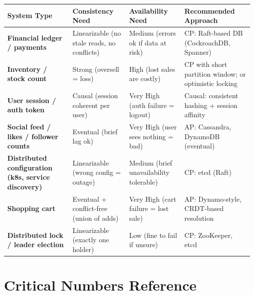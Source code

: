 \documentclass[11pt,a4paper]{article}
\begin{document}
\begin{center}
\begin{tabular}{>{\bfseries}p{3.2cm} p{3.5cm} p{3.5cm} p{3.8cm}}
\toprule
\textbf{System Type} & \textbf{Consistency Need} & \textbf{Availability Need} & \textbf{Recommended Approach} \\
\midrule
Financial ledger / payments & Linearizable (no stale reads, no conflicts) & Medium (errors ok if data at risk) & CP: Raft-based DB (CockroachDB, Spanner) \\
\addlinespace
Inventory / stock count & Strong (oversell = loss) & High (lost sales are costly) & CP with short partition window; or optimistic locking \\
\addlinespace
User session / auth token & Causal (session coherent per user) & Very High (auth failure = logout) & Causal: consistent hashing + session affinity \\
\addlinespace
Social feed / likes / follower counts & Eventual (brief lag ok) & Very High (user sees nothing = bad) & AP: Cassandra, DynamoDB (eventual) \\
\addlinespace
Distributed configuration (k8s, service discovery) & Linearizable (wrong config = outage) & Medium (brief unavailability tolerable) & CP: etcd (Raft) \\
\addlinespace
Shopping cart & Eventual + conflict-free (union of adds) & Very High (cart failure = lost sale) & AP: Dynamo-style, CRDT-based resolution \\
\addlinespace
Distributed lock / leader election & Linearizable (exactly one holder) & Low (fine to fail if unsure) & CP: ZooKeeper, etcd \\
\bottomrule
\end{tabular}
\end{center}

\section{Critical Numbers Reference}
\end{document}
